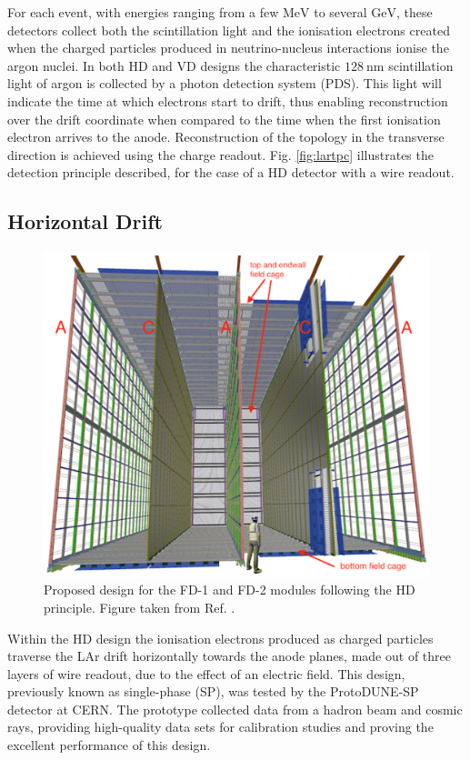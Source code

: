 For each event, with energies ranging from a few $\mathrm{MeV}$ to several $\mathrm{GeV}$, these detectors collect both the scintillation light and the ionisation electrons created when the charged particles produced in neutrino-nucleus interactions ionise the argon nuclei. In both HD and VD designs the characteristic $128~\mathrm{nm}$ scintillation light of argon is collected by a photon detection system (PDS). This light will indicate the time at which electrons start to drift, thus enabling reconstruction over the drift coordinate when compared to the time when the first ionisation electron arrives to the anode. Reconstruction of the topology in the transverse direction is achieved using the charge readout. Fig. \ref{fig:lartpc} illustrates the detection principle described, for the case of a HD detector with a wire readout.

\subsection{Horizontal Drift}

\begin{figure}[t]
	\centering
	\includegraphics[width=0.65\linewidth]{Images/DUNE/FD/dune_hd}
	\caption[Proposed design for the FD-1 and FD-2 modules following the HD principle.]{Proposed design for the FD-1 and FD-2 modules following the HD principle. Figure taken from Ref. \cite{DUNE2020TDR1}.}
	\label{fig:dune_hd}
\end{figure}

Within the HD design the ionisation electrons produced as charged particles traverse the LAr drift horizontally towards the anode planes, made out of three layers of wire readout, due to the effect of an electric field. This design, previously known as single-phase (SP), was tested by the ProtoDUNE-SP detector at CERN. The prototype collected data from a hadron beam and cosmic rays, providing high-quality data sets for calibration studies and proving the excellent performance of this design.

